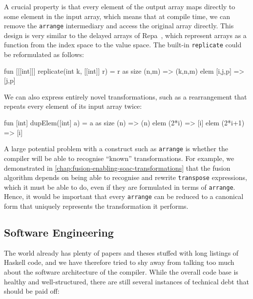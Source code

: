 A crucial property is that every element of the output array maps
directly to some element in the input array, which means that at
compile time, we can remove the \texttt{arrange} intermediary and
access the original array directly.  This design is very similar to
the delayed arrays of Repa~\cite{keller2010regular}, which represent
arrays as a function from the index space to the value space.  The
built-in \texttt{replicate} could be reformulated as follows:

\begin{colorcode}
fun [[[int]]] replicate(int k, [[int]] r) =
   r as
    size (n,m)   => (k,n,m)
    elem [i,j,p] => [j,p]
\end{colorcode}

We can also express entirely novel transformations, such as a
rearrangement that repeats every element of its input array twice:

\begin{colorcode}
fun [int] dupElem([int] a) =
   a as
    size (n)     => (n)
    elem (2*i)   => [i]
    elem (2*i+1) => [i]
\end{colorcode}

A large potential problem with a construct such as \texttt{arrange} is
whether the compiler will be able to recognise ``known''
transformations.  For example, we demonstrated in
\cref{chap:fusion-enabling-soac-transformations} that the fusion
algorithm depends on being able to recognise and rewrite
\texttt{transpose} expressions, which it must be able to do, even if
they are formulated in terms of \texttt{arrange}.  Hence, it would be
important that every \texttt{arrange} can be reduced to a canonical
form that uniquely represents the transformation it performs.

\subsection{Software Engineering}

The world already has plenty of papers and theses stuffed with long
listings of Haskell code, and we have therefore tried to shy away from
talking too much about the software architecture of the \LO{}
compiler.  While the overall code base is healthy and well-structured,
there are still several instances of technical debt that should be
paid off:

